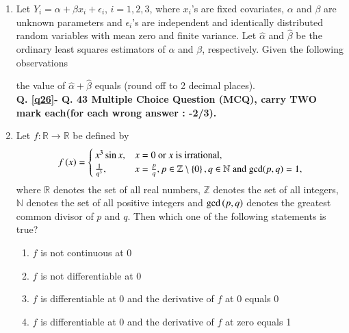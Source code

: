 \documentclass[journal]{IEEEtran}
\begin{document}
\begin{enumerate}
\item Let $Y_i = \alpha + \beta x_i + \epsilon_i$, $i = 1, 2, 3$, where $x_i$'s are fixed covariates, $\alpha$ and $\beta$ are unknown parameters and $\epsilon_i$'s are independent and identically distributed random variables with mean zero and finite variance. Let $\hat{\alpha}$ and $\hat{\beta}$ be the ordinary least squares estimators of $\alpha$ and $\beta$, respectively. Given the following observations
 \begin{table}[h!]
     \centering
     
 \end{table}
the value of $\hat{\alpha} + \hat{\beta}$ equals \underline{\hspace{1cm}} (round off to 2 decimal places).
\\ \textbf{ Q. \ref{q26}- Q. 43 Multiple Choice Question (MCQ), carry TWO mark each(for each wrong answer : -2/3).}
\item \label{q26} Let $f: \mathbb{R} \rightarrow \mathbb{R}$ be defined by
\begin{align*}
f\left(x\right) =
\begin{cases}
x^3 \sin x, & x = 0 \text{ or } x \text{ is irrational}, \\
\frac{1}{q^3}, & x = \frac{p}{q}, p \in \mathbb{Z} \setminus \left\{0\right\}, q \in \mathbb{N} \text{ and } \text{gcd}(p,q) = 1,
\end{cases}
\end{align*}
where $\mathbb{R}$ denotes the set of all real numbers, $\mathbb{Z}$ denotes the set of all integers, $\mathbb{N}$ denotes the set of all positive integers and $\text{gcd}\left(p, q\right)$ denotes the greatest common divisor of $p$ and $q$. Then which one of the following statements is true?

\begin{enumerate}
\item $f$ is not continuous at 0
\item $f$ is not differentiable at 0
\item $f$ is differentiable at 0 and the derivative of $f$ at 0 equals 0
\item $f$ is differentiable at 0 and the derivative of $f$ at zero equals 1
\end{enumerate}

 \end{enumerate}
 
\end{document}
